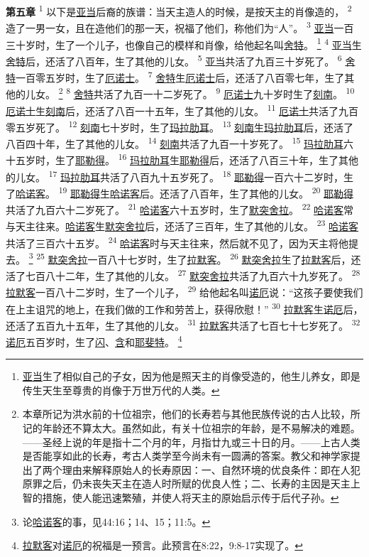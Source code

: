 \textbf{第五章\quad}
\textsuperscript{1}
以下是\uline{亚当}后裔的族谱：当天主造人的时候，是按天主的肖像造的，
\textsuperscript{2}
造了一男一女，且在造他们的那一天，祝福了他们，称他们为“人”。
\textsuperscript{3}
\uline{亚当}一百三十岁时，生了一个儿子，也像自己的模样和肖像，给他起名叫\uline{舍特}。
\footnote{\uline{亚当}生了相似自己的子女，因为他是照天主的肖像受造的，他生儿养女，即是传生天生至尊贵的肖像于万世万代的人类。}
\textsuperscript{4}
\uline{亚当}生\uline{舍特}后，还活了八百年，生了其他的儿女。
\textsuperscript{5}
\uline{亚当}共活了九百三十岁死了。
\textsuperscript{6}
\uline{舍特}一百零五岁时，生了\uline{厄诺士}。
\textsuperscript{7}
\uline{舍特}生\uline{厄诺士}后，还活了八百零七年，生了其他的儿女。
\footnote{本章所记为洪水前的十位祖宗，他们的长寿若与其他民族传说的古人比较，所记的年龄还不算太大。虽然如此，有关十位祖宗的年龄，是不易解决的难题。——圣经上说的年是指十二个月的年，月指廿九或三十日的月。——上古人类是否能享如此的长寿，考古人类学至今尚未有一圆满的答案。教父和神学家提出了两个理由来解释原始人的长寿原因：一、自然环境的优良条件：即在人犯原罪之后，仍未丧失天主在造人时所赋的优良人性；二、长寿的主因是天主上智的措施，使人能迅速繁殖，并使人将天主的原始启示传于后代子孙。}
\textsuperscript{8}
\uline{舍特}共活了九百一十二岁死了。
\textsuperscript{9}
\uline{厄诺士}九十岁时生了\uline{刻南}。
\textsuperscript{10}
\uline{厄诺士}生\uline{刻南}后，还活了八百一十五年，生了其他的儿女。
\textsuperscript{11}
\uline{厄诺士}共活了九百零五岁死了。
\textsuperscript{12}
\uline{刻南}七十岁时，生了\uline{玛拉肋耳}。
\textsuperscript{13}
\uline{刻南}生\uline{玛拉肋耳}后，还活了八百四十年，生了其他的儿女。
\textsuperscript{14}
\uline{刻南}共活了九百一十岁死了。
\textsuperscript{15}
\uline{玛拉肋耳}六十五岁时，生了\uline{耶勒得}。
\textsuperscript{16}
\uline{玛拉肋耳}生\uline{耶勒得}后，还活了八百三十年，生了其他的儿女。
\textsuperscript{17}
\uline{玛拉肋耳}共活了八百九十五岁死了。
\textsuperscript{18}
\uline{耶勒得}一百六十二岁时，生了\uline{哈诺客}。
\textsuperscript{19}
\uline{耶勒得}生\uline{哈诺客}后。还活了八百年，生了其他的儿女。
\textsuperscript{20}
\uline{耶勒得}共活了九百六十二岁死了。
\textsuperscript{21}
\uline{哈诺客}六十五岁时，生了\uline{默突舍拉}。
\textsuperscript{22}
\uline{哈诺客}常与天主往来。\uline{哈诺客}生\uline{默突舍拉}后，还活了三百年，生了其他的儿女。
\textsuperscript{23}
\uline{哈诺客}共活了三百六十五岁。
\textsuperscript{24}
\uline{哈诺客}时与天主往来，然后就不见了，因为天主将他提去。
\footnote{论\uline{哈诺客}的事，见44:16；14、15；11:5。}
\textsuperscript{25}
\uline{默突舍拉}一百八十七岁时，生了\uline{拉默客}。
\textsuperscript{26}
\uline{默突舍拉}生了\uline{拉默客}后，还活了七百八十二年，生了其他的儿女。
\textsuperscript{27}
\uline{默突舍拉}共活了九百六十九岁死了。
\textsuperscript{28}
\uline{拉默客}一百八十二岁时，生了一个儿子，
\textsuperscript{29}
给他起名叫\uline{诺厄}说：“这孩子要使我们在上主诅咒的地上，在我们做的工作和劳苦上，获得欣慰！”
\textsuperscript{30}
\uline{拉默客}生\uline{诺厄}后，还活了五百九十五年，生了其他的儿女。
\textsuperscript{31}
\uline{拉默客}共活了七百七十七岁死了。
\textsuperscript{32}
\uline{诺厄}五百岁时，生了\uline{闪}、\uline{含}和\uline{耶斐特}。
\footnote{\uline{拉默客}对\uline{诺厄}的祝福是一预言。此预言在8:22，9:8-17实现了。}

